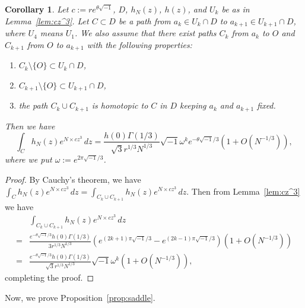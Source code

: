 \documentclass[a4paper,dvipdfmx]{amsart}
\theoremstyle{plain}
\newtheorem{cor}[thm]{Corollary}
\theoremstyle{definition}
\theoremstyle{remark}
\renewcommand{\i}{\sqrt{-1}}
\numberwithin{equation}{section}
\begin{document}
\begin{cor}\label{cor:cz^3}
Let $c:=re^{\theta\i}$, $D$, $h_N(z)$, $h(z)$, and $U_{k}$ be as in Lemma~\ref{lem:cz^3}.
Let $C\subset D$ be a path from $a_{k}\in U_{k}\cap D$ to $a_{k+1}\in U_{k+1}\cap D$, where $U_{4}$ means $U_{1}$.
We also assume that there exist paths $C_{k}$ from $a_{k}$ to $O$ and $C_{k+1}$ from $O$ to $a_{k+1}$ with the following properties:
\begin{enumerate}
\item
$C_{k}\setminus\{O\}\subset U_{k}\cap D$,
\item
$C_{k+1}\setminus\{O\}\subset U_{k+1}\cap D$,
\item
the path $C_{k}\cup C_{k+1}$ is homotopic to $C$ in $D$ keeping $a_{k}$ and $a_{k+1}$ fixed.
\end{enumerate}
Then we have
\begin{equation*}
  \int_{C}h_N(z)e^{N\times cz^3}\,dz
  =
  \frac{h(0)\Gamma(1/3)}{\sqrt{3}r^{1/3}N^{1/3}}\i\omega^{k}e^{-\theta\i/3}
  \left(1+O(N^{-1/3})\right),
\end{equation*}
where we put $\omega:=e^{2\pi\i/3}$.
\end{cor}
\begin{proof}
By Cauchy's theorem, we have $\int_{C}h_N(z)e^{N\times cz^3}\,dz=\int_{C_{k}\cup C_{k+1}}h_N(z)e^{N\times cz^3}\,dz$.
Then from Lemma~\ref{lem:cz^3} we have
\begin{align*}
  &\int_{C_{k}\cup C_{k+1}}h_N(z)e^{N\times cz^3}\,dz
  \\
  =&
  \frac{e^{-\theta\i/3}h(0)\Gamma(1/3)}{3r^{1/3}N^{1/3}}
  \left(e^{(2k+1)\pi\i/3}-e^{(2k-1)\pi\i/3}\right)
  \left(1+O(N^{-1/3})\right)
  \\
  =&
  \frac{e^{-\theta\i/3}h(0)\Gamma(1/3)}{\sqrt{3}r^{1/3}N^{1/3}}\i\omega^k
  \left(1+O(N^{-1/3})\right),
\end{align*}
completing the proof.
\end{proof}
\par
Now, we prove Proposition~\ref{prop:saddle}.
\end{document}
